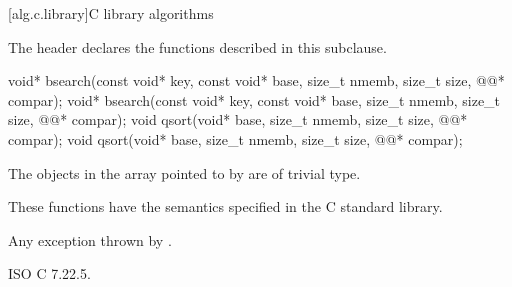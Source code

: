 [alg.c.library]{C library algorithms}

\pnum
\begin{note}
The header 
declares the functions described in this subclause.
\end{note}

%
%
\begin{itemdecl}
void* bsearch(const void* key, const void* base, size_t nmemb, size_t size,
              @@* compar);
void* bsearch(const void* key, const void* base, size_t nmemb, size_t size,
              @@* compar);
void qsort(void* base, size_t nmemb, size_t size, @@* compar);
void qsort(void* base, size_t nmemb, size_t size, @@* compar);
\end{itemdecl}

\begin{itemdescr}
\pnum
\expects
The objects in the array pointed to by  are of trivial type.

\pnum
\effects
These functions have the semantics specified in the C standard library.

\pnum
\throws
Any exception thrown by .
\end{itemdescr}

\xref
ISO C 7.22.5.
